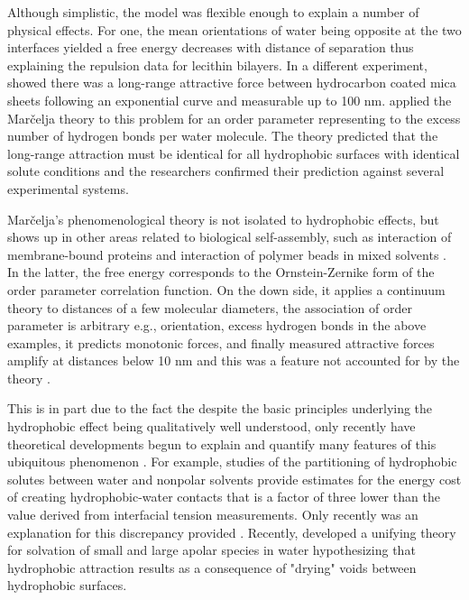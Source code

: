 Although simplistic,  the model was flexible enough to 
explain a number of physical effects. 
For one, the mean orientations of water 
being opposite at the two interfaces yielded a
free energy decreases  with distance of separation
thus explaining the repulsion data for lecithin bilayers.  
In a different experiment,
\cite{ClCh88} showed there was a 
long-range attractive force 
between hydrocarbon coated mica sheets 
following an exponential curve
and measurable  up to 100 nm.  
\cite{ErLjCl89} applied the Mar\v{c}elja theory to this problem 
for an order parameter representing to the excess number of
hydrogen bonds per water molecule.  
The theory predicted that the long-range attraction must be identical for all hydrophobic
surfaces with identical solute conditions and the researchers confirmed their prediction 
against several experimental systems.

Mar\v{c}elja's phenomenological theory 
is not isolated to hydrophobic effects, but 
shows up in other areas related to biological self-assembly,
such as interaction of membrane-bound proteins 
and interaction of polymer beads in mixed solvents \cite{deGe76}.
In the latter, the free energy corresponds to the Ornstein-Zernike form of the 
order parameter correlation function.  
On the down side, it applies a continuum theory to distances of a few molecular diameters,
the association of order parameter  is arbitrary e.g., orientation, excess hydrogen bonds in the above
examples, it predicts monotonic forces,
and finally measured attractive forces amplify at distances below 10 nm  
and this was a feature not accounted for by the theory \cite{Ni80}.

This is in part due to the fact the despite the basic principles underlying the 
hydrophobic effect being qualitatively well 
understood, only recently have theoretical developments begun to explain and quantify 
many features of this ubiquitous phenomenon \cite{Ch05}.
For example, studies of the partitioning of hydrophobic solutes between water and 
nonpolar solvents provide estimates for the energy cost of creating 
hydrophobic-water contacts that is a factor of three lower than the 
value derived from interfacial tension measurements. Only recently was
an explanation for this discrepancy provided  \cite{Ja16}.
Recently, \cite{LuChWe99} developed a unifying theory for solvation of small and large 
apolar species in water hypothesizing that hydrophobic attraction results as a consequence of "drying"
voids between hydrophobic surfaces. 

